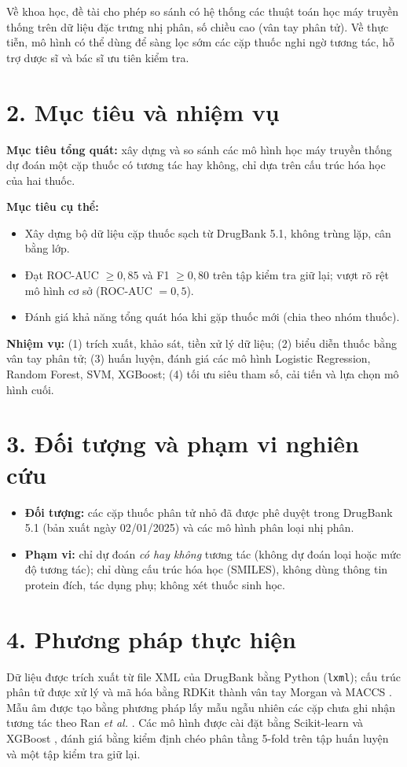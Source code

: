 \documentclass[12pt,a4paper,oneside]{report}
\begin{document}
Về khoa học, đề tài cho phép so sánh có hệ thống các thuật toán học máy truyền
thống trên dữ liệu đặc trưng nhị phân, số chiều cao (vân tay phân tử). Về thực
tiễn, mô hình có thể dùng để sàng lọc sớm các cặp thuốc nghi ngờ tương tác,
hỗ trợ dược sĩ và bác sĩ ưu tiên kiểm tra.

\section*{2. Mục tiêu và nhiệm vụ}
\textbf{Mục tiêu tổng quát:} xây dựng và so sánh các mô hình học máy truyền
thống dự đoán một cặp thuốc có tương tác hay không, chỉ dựa trên cấu trúc hóa
học của hai thuốc.

\textbf{Mục tiêu cụ thể:}
\begin{itemize}
  \item Xây dựng bộ dữ liệu cặp thuốc sạch từ DrugBank 5.1, không trùng lặp, cân bằng lớp.
  \item Đạt ROC-AUC $\geq 0{,}85$ và F1 $\geq 0{,}80$ trên tập kiểm tra giữ lại;
        vượt rõ rệt mô hình cơ sở (ROC-AUC $=0{,}5$).
  \item Đánh giá khả năng tổng quát hóa khi gặp thuốc mới (chia theo nhóm thuốc).
\end{itemize}

\textbf{Nhiệm vụ:} (1) trích xuất, khảo sát, tiền xử lý dữ liệu; (2) biểu diễn
thuốc bằng vân tay phân tử; (3) huấn luyện, đánh giá các mô hình Logistic
Regression, Random Forest, SVM, XGBoost; (4) tối ưu siêu tham số, cải tiến và
lựa chọn mô hình cuối.

\section*{3. Đối tượng và phạm vi nghiên cứu}
\begin{itemize}
  \item \textbf{Đối tượng:} các cặp thuốc phân tử nhỏ đã được phê duyệt trong
        DrugBank 5.1 (bản xuất ngày 02/01/2025) và các mô hình phân loại nhị phân.
  \item \textbf{Phạm vi:} chỉ dự đoán \emph{có hay không} tương tác (không dự
        đoán loại hoặc mức độ tương tác); chỉ dùng cấu trúc hóa học (SMILES),
        không dùng thông tin protein đích, tác dụng phụ; không xét thuốc sinh học.
\end{itemize}

\section*{4. Phương pháp thực hiện}
Dữ liệu được trích xuất từ file XML của DrugBank bằng Python (\texttt{lxml});
cấu trúc phân tử được xử lý và mã hóa bằng RDKit \cite{rdkit} thành vân tay
Morgan \cite{rogers2010} và MACCS \cite{durant2002}. Mẫu âm được tạo bằng
phương pháp lấy mẫu ngẫu nhiên các cặp chưa ghi nhận tương tác theo Ran
\textit{et al.} \cite{ran2022}. Các mô hình được cài đặt bằng Scikit-learn
\cite{pedregosa2011} và XGBoost \cite{chen2016}, đánh giá bằng kiểm định chéo
phân tầng 5-fold trên tập huấn luyện và một tập kiểm tra giữ lại.
\end{document}

